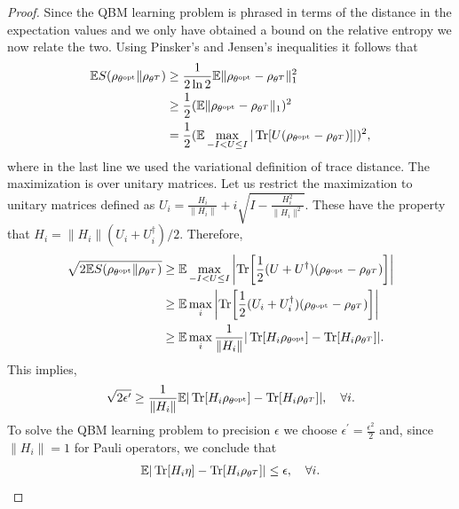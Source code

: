 \documentclass[
    reprint,
    aps,
    prx,
    longbibliography
]{revtex4-2}
\begin{document}
\begin{proof}
Since the QBM learning problem is phrased in terms of the distance in the expectation values and we only have obtained a bound on the relative entropy we now relate the two. Using Pinsker's and Jensen's inequalities it follows that
\begin{align}
\begin{split}
    \mathbb{E} S(\rho_{\theta^\mathrm{opt}} \|\rho_{\theta^T}) &\geq \frac{1}{2 \ln 2} \mathbb{E} \| \rho_{\theta^\mathrm{opt}} - \rho_{\theta^T}  \|^2_1 \\
    &\geq \frac{1}{2} ( \mathbb{E} \| \rho_{\theta^\mathrm{opt}} - \rho_{\theta^T}  \|_1 )^2 \\
    &= \frac{1}{2} ( \mathbb{E} \max_{-I < U \leq I} | \Tr[ U (\rho_{\theta^\mathrm{opt}} - \rho_{\theta^T}) ] | )^2,
\end{split}
\end{align}
where in the last line we used the variational definition of trace distance. The maximization is over unitary matrices. Let us restrict the maximization to unitary matrices defined as $U_i = \frac{H_i}{\| H_i \|} + i \sqrt{ I - \frac{H_i^2}{\| H_i \|^2} }$. These have the property that $H_i = \| H_i \| (U_i + U_i^\dag )/2$. 
Therefore,
\begin{align}
\begin{split}
    \sqrt{2\mathbb{E} S(\rho_{\theta^\mathrm{opt}} \|\rho_{\theta^T})} &\geq \mathbb{E} \max_{-I < U \leq I} \left| \Tr[ \frac{1}{2}(U + U^\dag) (\rho_{\theta^\mathrm{opt}} - \rho_{\theta^T}) ] \right| \\
    &\geq \mathbb{E} \max_i \left| \Tr[ \frac{1}{2}(U_i + U_i^\dag)(\rho_{\theta^\mathrm{opt}} - \rho_{\theta^T}) ] \right| \\
    & \geq \mathbb{E} \max_i \frac{1}{\| H_i\|} | \Tr[ H_i \rho_{\theta^\mathrm{opt}}]  - \Tr[ H_i \rho_{\theta^T} ] | .
\end{split}
\end{align}
This implies,
\begin{align}
    \sqrt{2\epsilon^\prime} \geq \frac{1}{\| H_i \| } \mathbb{E} | \Tr[ H_i \rho_{\theta^\mathrm{opt}}]  - \Tr[ H_i \rho_{\theta^T} ] | , \quad \forall i . 
\end{align}
To solve the QBM learning problem to precision $\epsilon$ we choose $\epsilon^\prime = \frac{\epsilon^2}{2}$ and, since $\| H_i \| = 1$ for Pauli operators, we conclude that
\begin{align}
    \mathbb{E} | \Tr[ H_i \eta]  - \Tr[ H_i \rho_{\theta^T} ] | \leq \epsilon , \quad \forall i . 
\end{align}
\end{proof}
\end{document}
